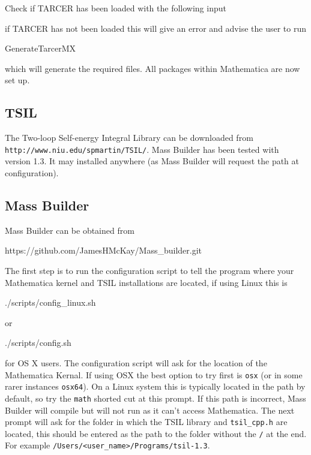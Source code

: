 Check if TARCER has been loaded with the following input
if TARCER has not been loaded this will give an error and advise the user to run
\begin{lstterm}
GenerateTarcerMX
\end{lstterm}
which will generate the required files.  All packages within Mathematica are now set up.

\subsection{TSIL}
The Two-loop Self-energy Integral Library can be downloaded from \lstinline{http://www.niu.edu/spmartin/TSIL/}.  Mass Builder has been tested with version 1.3. It may installed anywhere (as Mass Builder will request the path at configuration).

\subsection{Mass Builder}
Mass Builder can be obtained from

\begin{lstterm}
https://github.com/JamesHMcKay/Mass_builder.git
\end{lstterm}

The first step is to run the configuration script to tell the program where your Mathematica kernel and TSIL installations are located, if using Linux this is
\begin{lstterm}
./scripts/config_linux.sh
\end{lstterm}
or
\begin{lstterm}
./scripts/config.sh
\end{lstterm}
for OS X users.  The configuration script will ask for the location of the Mathematica Kernal.  If using OSX the best option to try first is \lstinline{osx} (or in some rarer instances \lstinline{osx64}).  On a Linux system this is typically located in the path by default, so try the \lstinline{math} shorted cut at this prompt.  If this path is incorrect, Mass Builder will compile but will not run as it can't access Mathematica.  The next prompt will ask for the folder in which the TSIL library and \lstinline{tsil_cpp.h} are located, this should be entered as the path to the folder without the \lstinline{/} at the end.  For example \lstinline{/Users/<user_name>/Programs/tsil-1.3}.

